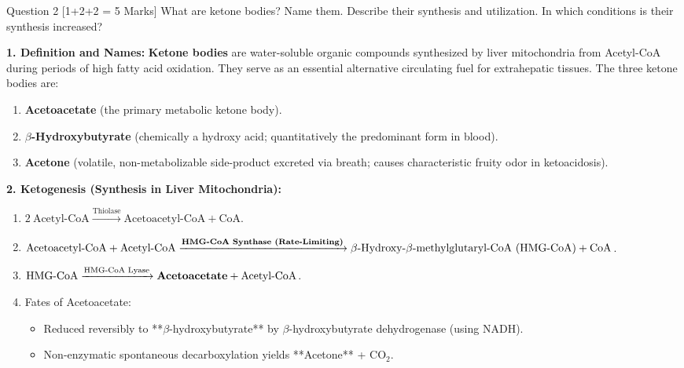 \documentclass[11pt,a4paper]{article}
\begin{document}
\begin{qbox}{Question 2 [1+2+2 = 5 Marks]}
What are ketone bodies? Name them. Describe their synthesis and utilization. In which conditions is their synthesis increased?
\end{qbox}

\begin{ansbox}
\textbf{1. Definition and Names:}
\textbf{Ketone bodies} are water-soluble organic compounds synthesized by liver mitochondria from Acetyl-CoA during periods of high fatty acid oxidation. They serve as an essential alternative circulating fuel for extrahepatic tissues. The three ketone bodies are:
\begin{enumerate}[leftmargin=*]
    \item \textbf{Acetoacetate} (the primary metabolic ketone body).
    \item \textbf{$\beta$-Hydroxybutyrate} (chemically a hydroxy acid; quantitatively the predominant form in blood).
    \item \textbf{Acetone} (volatile, non-metabolizable side-product excreted via breath; causes characteristic fruity odor in ketoacidosis).
\end{enumerate}

\textbf{2. Ketogenesis (Synthesis in Liver Mitochondria):}
\begin{enumerate}[leftmargin=*]
    \item $2\ \text{Acetyl-CoA} \xrightarrow{\text{Thiolase}} \text{Acetoacetyl-CoA} + \text{CoA}$.
    \item $\text{Acetoacetyl-CoA} + \text{Acetyl-CoA} \xrightarrow{\text{\textbf{HMG-CoA Synthase (Rate-Limiting)}}} \beta\text{-Hydroxy-}\beta\text{-methylglutaryl-CoA (HMG-CoA)} + \text{CoA}$.
    \item $\text{HMG-CoA} \xrightarrow{\text{HMG-CoA Lyase}} \text{\textbf{Acetoacetate}} + \text{Acetyl-CoA}$.
    \item Fates of Acetoacetate:
    \begin{itemize}
        \item Reduced reversibly to **$\beta$-hydroxybutyrate** by $\beta$-hydroxybutyrate dehydrogenase (using NADH).
        \item Non-enzymatic spontaneous decarboxylation yields **Acetone** + $\text{CO}_2$.
    \end{itemize}
\end{enumerate}


\end{ansbox}
\end{document}
